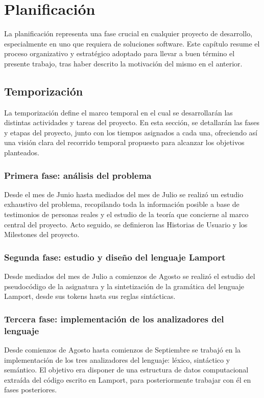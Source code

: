 \chapter{\textbf{Planificación}}
La planificación representa una fase crucial en cualquier proyecto de desarrollo, especialmente en uno que requiera de soluciones software. Este capítulo resume el proceso organizativo y estratégico adoptado para llevar a buen término el presente trabajo, tras haber descrito la motivación del mismo en el anterior.

\section{Temporización}
La temporización define el marco temporal en el cual se desarrollarán las distintas actividades y tareas del proyecto. En esta sección, se detallarán las fases y etapas del proyecto, junto con los tiempos asignados a cada una, ofreciendo así una visión clara del recorrido temporal propuesto para alcanzar los objetivos planteados.

\subsection{Primera fase: análisis del problema}
Desde el mes de Junio hasta mediados del mes de Julio se realizó un estudio exhaustivo del problema, recopilando toda la información posible a base de testimonios de personas reales y el estudio de la teoría que concierne al marco central del proyecto. Acto seguido, se definieron las Historias de Usuario y los Milestones del proyecto.

\subsection{Segunda fase: estudio y diseño del lenguaje Lamport}
Desde mediados del mes de Julio a comienzos de Agosto se realizó el estudio del pseudocódigo de la asignatura y la sintetización de la gramática del lenguaje Lamport, desde sus tokens hasta sus reglas sintácticas.

\subsection{Tercera fase: implementación de los analizadores del lenguaje}
Desde comienzos de Agosto hasta comienzos de Septiembre se trabajó en la implementación de los tres analizadores del lenguaje: léxico, sintáctico y semántico. El objetivo era disponer de una estructura de datos computacional extraída del código escrito en Lamport, para posteriormente trabajar con él en fases posteriores.

